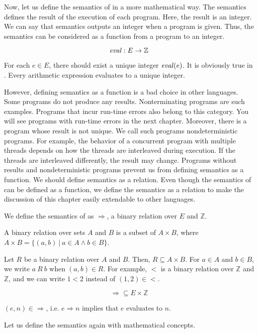 Now, let us define the semantics of \lang in a more mathematical way. The
semantics defines the result of the execution of each program. Here, the result
is an integer. We can say that semantics outputs an integer when a program is
given. Thus, the semantics can be considered as a function from a program to an
integer.

\[\mbox{\emph{eval}}:E\rightarrow \mathbb{Z}\]

For each $e\in E$, there should exist a unique integer $\mbox{\emph{eval}}(e)$. It
is obviously true in \lang. Every arithmetic expression evaluates to a unique
integer.

However, defining semantics as a function is a bad choice in other languages.
Some programs do not produce any results. Nonterminating programs are such
examples. Programs that incur run-time errors also belong to this category. You
will see programs with run-time errors in the next chapter. Moreover, there is a
program whose result is not unique. We call such programs nondeterministic
programs. For example, the behavior of a concurrent program with multiple
threads depends on how the threads are interleaved during execution. If the
threads are interleaved differently, the result may change. Programs without
results and nondeterministic programs prevent us from defining semantics as a
function. We should define semantics as a relation. Even though the semantics of
\lang can be defined as a function, we define the semantics as a relation to
make the discussion of this chapter easily extendable to other languages.

We define the semantics of \lang as $\Rightarrow$, a binary relation over $E$
and $\mathbb{Z}$.

\begin{kaobox}[frametitle=Binary relations]
A binary relation over sets $A$ and $B$ is a subset of $A\times B$,
where $A\times B=\{(a,b)\ |\ a\in A\land b\in B\}$.

Let $R$ be a binary relation over $A$ and $B$. Then, $R \subseteq A\times B$. For $a\in
A$ and $b\in B$, we write $a\ R\ b$ when $(a,b)\in R$. For example, $<$ is a
binary relation over $\mathbb{Z}$ and $\mathbb{Z}$, and we can write $1<2$ instead of
$(1,2)\in<$.
\end{kaobox}

\[\Rightarrow\subseteq E\times\mathbb{Z}\]

$(e,n)\in\Rightarrow$, i.e. $e\Rightarrow n$ implies that $e$ evaluates to $n$.

Let us define the semantics again with mathematical concepts.

